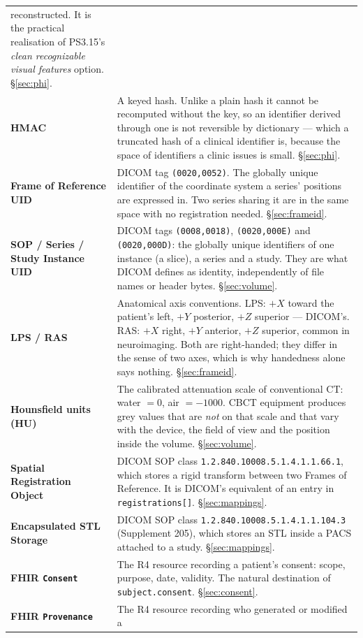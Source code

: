 \documentclass[11pt,a4paper]{article}
\newcommand{\code}[1]{\texttt{\small #1}}
\begin{document}
\begin{longtable}{L{4.3cm} L{11.1cm}}
reconstructed. It is the practical realisation of PS3.15's \emph{clean recognizable visual
features} option. \S\ref{sec:phi}.\\
\textbf{HMAC} & A keyed hash. Unlike a plain hash it cannot be recomputed without the key,
so an identifier derived through one is not reversible by dictionary --- which a truncated
hash of a clinical identifier is, because the space of identifiers a clinic issues is
small. \S\ref{sec:phi}.\\
\textbf{Frame of Reference UID} & DICOM tag \code{(0020,0052)}. The globally unique
identifier of the coordinate system a series' positions are expressed in. Two series
sharing it are in the same space with no registration needed.
\S\ref{sec:frameid}.\\
\textbf{SOP / Series / Study Instance UID} & DICOM tags \code{(0008,0018)},
\code{(0020,000E)} and \code{(0020,000D)}: the globally unique identifiers of one instance
(a slice), a series and a study. They are what DICOM defines as identity, independently of
file names or header bytes. \S\ref{sec:volume}.\\
\textbf{LPS / RAS} & Anatomical axis conventions. LPS: $+X$ toward the patient's left, $+Y$
posterior, $+Z$ superior --- DICOM's. RAS: $+X$ right, $+Y$ anterior, $+Z$ superior, common
in neuroimaging. Both are right-handed; they differ in the sense of two axes, which is why
handedness alone says nothing. \S\ref{sec:frameid}.\\
\textbf{Hounsfield units (HU)} & The calibrated attenuation scale of conventional CT: water
$=0$, air $=-1000$. CBCT equipment produces grey values that are \emph{not} on that scale
and that vary with the device, the field of view and the position inside the volume.
\S\ref{sec:volume}.\\
\textbf{Spatial Registration Object} & DICOM SOP class
\code{1.2.840.10008.5.1.4.1.1.66.1}, which stores a rigid transform between two Frames of
Reference. It is DICOM's equivalent of an entry in \code{registrations[]}.
\S\ref{sec:mappings}.\\
\textbf{Encapsulated STL Storage} & DICOM SOP class
\code{1.2.840.10008.5.1.4.1.1.104.3} (Supplement 205), which stores an STL inside a PACS
attached to a study. \S\ref{sec:mappings}.\\
\textbf{FHIR \code{Consent}} & The R4 resource recording a patient's consent: scope,
purpose, date, validity. The natural destination of \code{subject.consent}.
\S\ref{sec:consent}.\\
\textbf{FHIR \code{Provenance}} & The R4 resource recording who generated or modified a

\end{longtable}
\end{document}
